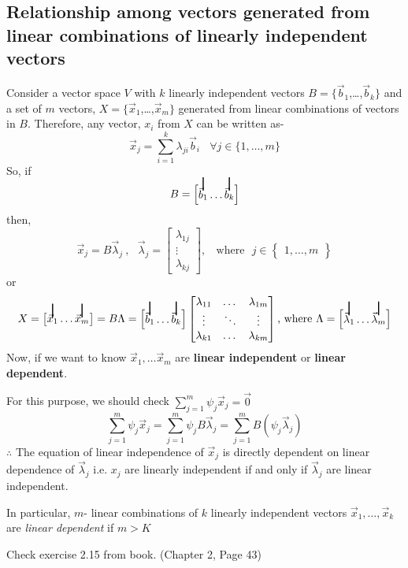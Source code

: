 \documentclass{article}
\newcommand\vstrike[1]{\stackon[0pt]{#1}{\smash{\rule[-3pt]{1pt}{2.9ex}}}}
\begin{document}
\subsection{Relationship among vectors generated from linear combinations of linearly independent vectors}
Consider a vector space $V$ with $k$ linearly independent vectors $B = \{\vec{b}_1$,\ldots,$\vec{b}_k\}$ and a set of $m$ vectors, $X =  \{\vec{x}_1$,\ldots,$\vec{x}_m\}$ generated from linear combinations of vectors in $B$. Therefore, any vector, $x_i$ from $X$ can be written as-
\[\vec{x}_j= \sum_{i=1}^{k} \lambda_{ji}\vec{b}_i~~~~\forall j\in \{1,\ldots,m\}\]
So, if\[B = \begin{bmatrix} \vstrike{$\vec{b}_1$}\dots\vstrike{$\vec{b}_k$}\end{bmatrix}\]
then,\[\vec{x}_j = B\vec{\lambda}_j~,~~~\vec{\lambda}_j = 
\begin{bmatrix}
\lambda_{1j}\\
\vdots\\
\lambda_{kj}
\end{bmatrix},~~~~
 \text{where}~~~j\in \begin{Bmatrix} 1,\dots,m\end{Bmatrix}
\]
or 
\[
X = \begin{bmatrix}
\vstrike{$\vec{x}_1$}\dots\vstrike{$\vec{x}_m$}
\end{bmatrix} = 
B\Lambda = \begin{bmatrix}
\vstrike{$\vec{b}_1$}\dots\vstrike{$\vec{b}_k$}
\end{bmatrix}
\begin{bmatrix}
\lambda_{11} & \dots & \lambda_{1m}\\
\vdots &\ddots  & \vdots\\
\lambda_{k1} & \dots& \lambda_{km}
\end{bmatrix}\text{, where }\Lambda = \begin{bmatrix} \vstrike{$\vec{\lambda}_1$}\dots\vstrike{$\vec{\lambda}_m$}\end{bmatrix}
\]
Now, if we want to know $\vec{x}_1,\dots\vec{x}_m$ are \textbf{linear independent} or \textbf{linear dependent}.

For this purpose, we should check $\sum_{j=1}^{m} \psi_j \vec{x}_j = \vec{0}$  
\[
\sum_{j=1}^{m} \psi_j \vec{x}_j = \sum_{j=1}^{m} \psi_j B \vec{\lambda}_j = \sum_{j=1}^{m} B( \psi_j \vec{\lambda}_j )
\]
$\therefore$ The equation of linear independence of $\vec{x}_j$ is directly dependent on linear dependence of $\vec{\lambda}_j$ i.e. $x_j$ are linearly independent if and only if $\vec{\lambda}_j$ are linear independent.

In particular, $m$- linear combinations of $k$ linearly independent vectors $\vec{x}_1,\dots,\vec{x}_k$ are \textit{linear dependent} if $m > K$

Check exercise 2.15 from book. (Chapter 2, Page 43)
\end{document}
